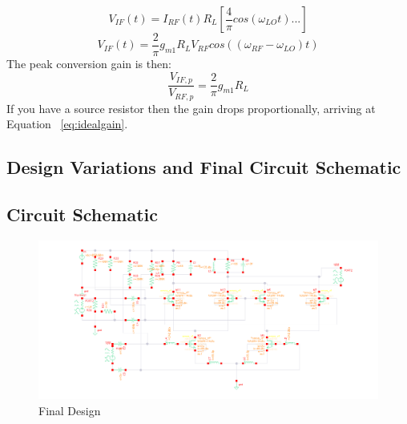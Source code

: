 \documentclass{article}                                                         %
\begin{document}
\begin{equation}
  \label{eq:VIFt2}
  V_{IF}(t) = I_{RF}(t)R_L[\dfrac{4}{\pi}cos(\omega_{LO}t)...]
\end{equation}
\begin{equation}
  \label{eq:VIFt3}
  V_{IF}(t) = \dfrac{2}{\pi}g_{m1}R_LV_{RF}cos((\omega_{RF}-\omega_{LO})t)
\end{equation}
The peak conversion gain is then:
\begin{equation}
  \label{eq:Vgain}
  \dfrac{V_{IF,p}}{V_{RF,p}} = \dfrac{2}{\pi}g_{m1}R_L
\end{equation}
If you have a source resistor then the gain drops proportionally, arriving at Equation ~\ref{eq:idealgain}.
\newpage
\begin{landscape}

\section{Design Variations and Final Circuit Schematic}
\subsection{Circuit Schematic}

\begin{figure}[H]
  \centering
  \includegraphics[width=1.5\textwidth] {Figures/Circuit.png}
  \caption{Final Design}
    \label{fig:finalschem}
\end{figure}
\end{landscape}
\newpage
\end{document}
